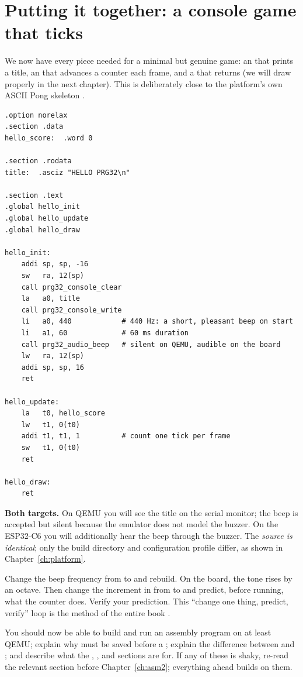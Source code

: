 \section{Putting it together: a console game that ticks}

We now have every piece needed for a minimal but genuine game: an 
that prints a title, an  that advances a counter each frame, and a
 that returns (we will draw properly in the next chapter). This is
deliberately close to the platform's own ASCII Pong skeleton
\citep{prg32tutorialascii}.

\begin{lstlisting}[style=asm,caption={A complete, minimal ASCII game. It runs identically on QEMU and the ESP32\nobreakdash-C6.}]
.option norelax
.section .data
hello_score:  .word 0

.section .rodata
title:  .asciz "HELLO PRG32\n"

.section .text
.global hello_init
.global hello_update
.global hello_draw

hello_init:
    addi sp, sp, -16
    sw   ra, 12(sp)
    call prg32_console_clear
    la   a0, title
    call prg32_console_write
    li   a0, 440            # 440 Hz: a short, pleasant beep on start
    li   a1, 60             # 60 ms duration
    call prg32_audio_beep   # silent on QEMU, audible on the board
    lw   ra, 12(sp)
    addi sp, sp, 16
    ret

hello_update:
    la   t0, hello_score
    lw   t1, 0(t0)
    addi t1, t1, 1          # count one tick per frame
    sw   t1, 0(t0)
    ret

hello_draw:
    ret
\end{lstlisting}

\begin{prgtargets}
\textbf{Both targets.} On QEMU you will see the title on the serial monitor; the
beep is accepted but silent because the emulator does not model the buzzer. On the
ESP32\nobreakdash-C6 you will additionally hear the beep through the buzzer. The
\emph{source is identical}; only the build directory and configuration profile
differ, as shown in Chapter~\ref{ch:platform}.
\end{prgtargets}

\begin{prgtry}
Change the beep frequency from  to  and rebuild. On the board,
the tone rises by an octave. Then change the increment in 
from  to  and predict, before running, what the counter does.
Verify your prediction. This ``change one thing, predict, verify'' loop is the
method of the entire book \citep{prg32repo}.
\end{prgtry}

\begin{prgcheck}
You should now be able to build and run an assembly program on at least QEMU;
explain why  must be saved before a ; explain the difference
between  and ; and describe what the , ,
and  sections are for. If any of these is shaky, re-read the
relevant section before Chapter~\ref{ch:asm2}; everything ahead builds on them.
\end{prgcheck}
